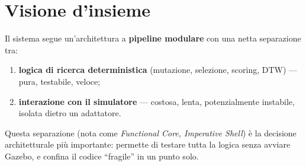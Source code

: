 \documentclass[11pt,a4paper]{report}
\begin{document}
\section{Visione d'insieme}
Il sistema segue un'architettura a \textbf{pipeline modulare} con una
netta separazione tra:
\begin{enumerate}
  \item \textbf{logica di ricerca deterministica} (mutazione, selezione,
        scoring, DTW) --- pura, testabile, veloce;
  \item \textbf{interazione con il simulatore} --- costosa, lenta,
        potenzialmente instabile, isolata dietro un adattatore.
\end{enumerate}
Questa separazione (nota come \emph{Functional Core, Imperative Shell})
è la decisione architetturale più importante: permette di testare tutta
la logica senza avviare Gazebo, e confina il codice ``fragile'' in un
punto solo.
\end{document}
